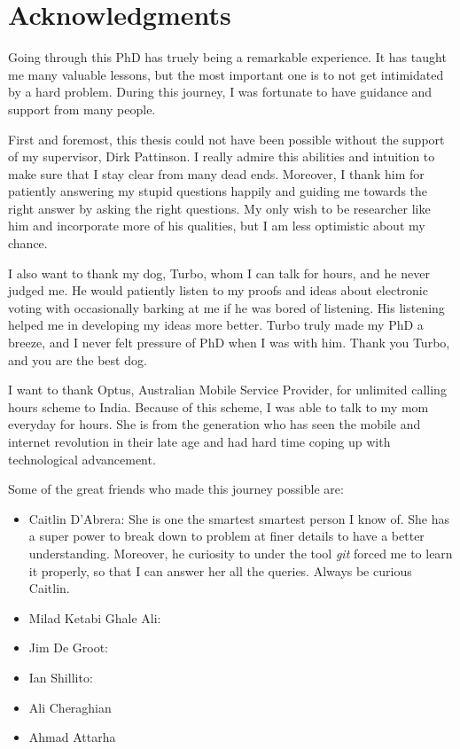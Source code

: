 \chapter*{Acknowledgments}
Going through this PhD has truely being a remarkable experience.  It has taught me many valuable lessons, 
but the most important one is to not get intimidated by a hard problem.  During this journey, I 
was fortunate to have guidance and support from many people. 	


First and foremost, this thesis could not have been possible without the support of my supervisor, Dirk Pattinson. I really 
admire this abilities and intuition to make sure that I stay clear from many dead ends. Moreover, 
I thank him for patiently answering my stupid questions happily and guiding me towards the right 
answer by asking the right questions. My only wish to be researcher like 
him and incorporate more of his qualities, but I am less optimistic about my chance. 

I also want to thank my dog, Turbo, whom I can talk for hours, and he never judged me. He 
would patiently listen to my proofs
and ideas about electronic voting with occasionally barking at me if he was bored of listening. 
His listening helped me in developing my ideas more better. 
Turbo truly made my PhD a breeze, and I never felt pressure of PhD when I was with him. Thank you
Turbo, and you are the best dog. 


I want to thank Optus, Australian Mobile Service Provider, for unlimited calling hours scheme to India. 
Because of this scheme, I was able to talk to my mom everyday for hours. She is from the generation 
who has seen the mobile and internet revolution in their late age and had hard time coping up with
technological advancement. 
 
  
Some of the great friends who made this journey possible are:
\begin{itemize}
\item Caitlin D'Abrera: 
  She is one the smartest smartest person I know of. She has a super power to break down to problem at finer details 
  to have a better understanding. Moreover, he curiosity to under the tool \textit{git} forced me to learn it properly, 
  so that I can answer her all the queries. Always be curious Caitlin. 
  
 \item Milad Ketabi Ghale Ali: 
   
  \item   Jim De Groot:
  
  \item  Ian Shillito:
  
  \item  Ali Cheraghian
  
  \item Ahmad Attarha
\end{itemize} 


